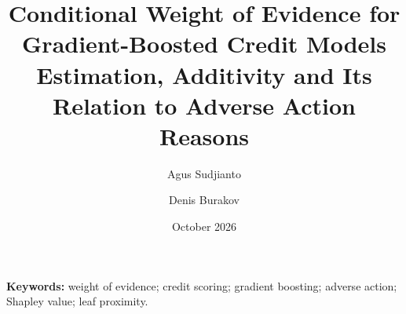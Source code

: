 \documentclass[11pt]{article}
\title{\textbf{Conditional Weight of Evidence for Gradient-Boosted Credit Models}\\[4pt]
\large Estimation, Additivity and Its Relation to Adverse Action Reasons}
\author{Agus Sudjianto \and Denis Burakov}
\date{October 2026}
\begin{document}
\maketitle



\textbf{Keywords:} weight of evidence; credit scoring; gradient boosting; adverse action; Shapley value; leaf proximity.



\clearpage
\appendix


\clearpage

\end{document}
